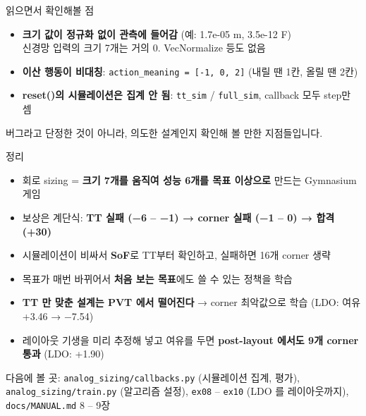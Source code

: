 \documentclass[aspectratio=169,11pt,xcolor=table]{beamer}
\newcommand{\cc}[1]{\texttt{#1}}
\begin{document}
\begin{frame}{읽으면서 확인해볼 점}
  \begin{itemize}\small
    \item \textbf{크기 값이 정규화 없이 관측에 들어감} (예: 1.7e-05 m, 3.5e-12 F)\\
          {\footnotesize 신경망 입력의 크기 7개는 거의 0. VecNormalize 등도 없음}
    \item \textbf{이산 행동이 비대칭}: \cc{action\_meaning = [-1, 0, 2]} (내릴 땐 1칸, 올릴 땐 2칸)
    \item \textbf{reset()의 시뮬레이션은 집계 안 됨}: \cc{tt\_sim} / \cc{full\_sim}, callback 모두 step만 셈
  \end{itemize}
  \vspace{0.2em}
  {\footnotesize\color{muted} 버그라고 단정한 것이 아니라, 의도한 설계인지 확인해 볼 만한 지점들입니다.}
\end{frame}

\begin{frame}{정리}
  \begin{keybox}
    \begin{itemize}\small
      \item 회로 sizing = \textbf{크기 7개를 움직여 성능 6개를 목표 이상으로} 만드는 Gymnasium 게임
      \item 보상은 계단식: \textbf{TT 실패 (−6 – −1) → corner 실패 (−1 – 0) → 합격 (+30)}
      \item 시뮬레이션이 비싸서 \textbf{SoF}로 TT부터 확인하고, 실패하면 16개 corner 생략
      \item 목표가 매번 바뀌어서 \textbf{처음 보는 목표}에도 쓸 수 있는 정책을 학습
      \item \textbf{TT 만 맞춘 설계는 PVT 에서 떨어진다} → corner 최악값으로 학습 (LDO: 여유 +3.46 → −7.54)
      \item 레이아웃 기생을 미리 추정해 넣고 여유를 두면 \textbf{post-layout 에서도 9개 corner 통과} (LDO: +1.90)
    \end{itemize}
  \end{keybox}
  \vspace{0.4em}
  {\small 다음에 볼 곳: \cc{analog\_sizing/callbacks.py} (시뮬레이션 집계, 평가), \cc{analog\_sizing/train.py} (알고리즘 설정),
   \cc{ex08} – \cc{ex10} (LDO 를 레이아웃까지), \cc{docs/MANUAL.md} 8 – 9장}
\end{frame}
\end{document}
